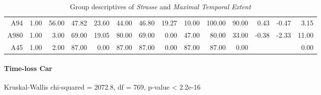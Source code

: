 \begin{table}[ht!]
\begin{tabular}{rrrrrrrrrrrrrr}
    A94  & 1.00 & 56.00 & 47.82 & 23.60 & 44.00 & 46.80 & 19.27 & 10.00 & 100.00 & 90.00 & 0.43 & -0.47 & 3.15 \\ 
    A980 & 1.00 & 3.00 & 69.00 & 19.05 & 80.00 & 69.00 & 0.00 & 47.00 & 80.00 & 33.00 & -0.38 & -2.33 & 11.00 \\ 
    A45  & 1.00 & 2.00 & 87.00 & 0.00 & 87.00 & 87.00 & 0.00 & 87.00 & 87.00 & 0.00 &  &  & 0.00 \\ 
    \hline
  \end{tabular}
	\caption{Group descriptives of \textit{Strasse} and \textit{Maximal Temporal Extent}}
	\label{tbl:descriptives_baysis_matched_Strasse_TMax}
\end{table}

\paragraph{Time-loss Car}
Kruskal-Wallis chi-squared = 2072.8, df = 769, p-value < 2.2e-16

